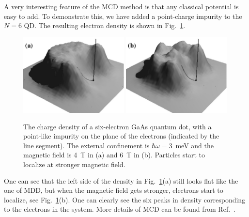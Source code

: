 \documentclass{article}
\begin{document}
A very interesting feature of the MCD method is that any classical
potential is easy to add. To demonstrate this, we have added a
point-charge impurity to the $N=6$ QD. The resulting electron density
is shown in Fig.~\ref{imp}.
\begin{figure}[hbt]
\begin{center}
 \includegraphics[width=0.49\textwidth,angle=0]{B4}
 \includegraphics[width=0.49\textwidth,angle=0]{B6}\\
\caption{ The charge density of a six-electron GaAs quantum dot, with
    a point-like impurity on the plane of the electrons (indicated by
    the line segment). The external confinement is $\hbar \omega =
    3$~meV and the magnetic field is 4~T in (a) and 6~T in (b).
    Particles start to localize at stronger magnetic field. }
\label{imp}
\end{center}
\end{figure}
One can see that the left side of the density in Fig.~\ref{imp}(a)
still looks flat like the one of MDD, but when the magnetic field gets
stronger, electrons start to localize, see Fig.~\ref{imp}(b). One can
clearly see the six peaks in density corresponding to the electrons in
the system. More details of MCD can be found from
Ref.~.
\end{document}
